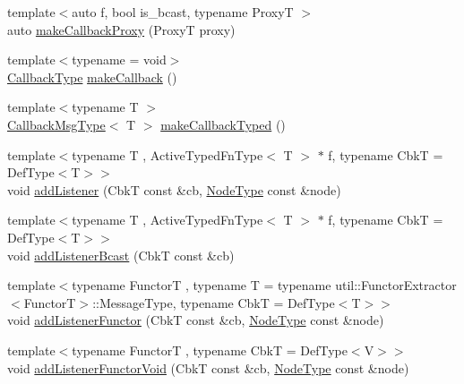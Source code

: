 \begin{DoxyCompactItemize}
\item 
{\footnotesize template$<$auto f, bool is\+\_\+bcast, typename ProxyT $>$ }\\auto \hyperlink{structvt_1_1pipe_1_1_pipe_manager_t_l_a342691748229aa8765834fe3dcec04b3}{make\+Callback\+Proxy} (ProxyT proxy)
\item 
{\footnotesize template$<$typename  = void$>$ }\\\hyperlink{structvt_1_1pipe_1_1_pipe_manager_t_l_a1cc1d0f1c80a36488f9b5d282e9755d2}{Callback\+Type} \hyperlink{structvt_1_1pipe_1_1_pipe_manager_t_l_aff965bd75d398d45ad11d33feeb7a7c5}{make\+Callback} ()
\item 
{\footnotesize template$<$typename T $>$ }\\\hyperlink{structvt_1_1pipe_1_1_pipe_manager_t_l_af6fc2c17f1729fa06450441b0ee81cb1}{Callback\+Msg\+Type}$<$ T $>$ \hyperlink{structvt_1_1pipe_1_1_pipe_manager_t_l_a9644742f82b43a851e8a20755302a2e0}{make\+Callback\+Typed} ()
\item 
{\footnotesize template$<$typename T , Active\+Typed\+Fn\+Type$<$ T $>$ $\ast$ f, typename CbkT  = Def\+Type$<$\+T$>$$>$ }\\void \hyperlink{structvt_1_1pipe_1_1_pipe_manager_t_l_a379d983dfbf654ed01281d96148175f3}{add\+Listener} (CbkT const \&cb, \hyperlink{namespacevt_a866da9d0efc19c0a1ce79e9e492f47e2}{Node\+Type} const \&node)
\item 
{\footnotesize template$<$typename T , Active\+Typed\+Fn\+Type$<$ T $>$ $\ast$ f, typename CbkT  = Def\+Type$<$\+T$>$$>$ }\\void \hyperlink{structvt_1_1pipe_1_1_pipe_manager_t_l_a137d7271f189aa000427a3cb39bd7f52}{add\+Listener\+Bcast} (CbkT const \&cb)
\item 
{\footnotesize template$<$typename FunctorT , typename T  = typename util\+::\+Functor\+Extractor$<$\+Functor\+T$>$\+::\+Message\+Type, typename CbkT  = Def\+Type$<$\+T$>$$>$ }\\void \hyperlink{structvt_1_1pipe_1_1_pipe_manager_t_l_abc9236c8ff7a657b1b04fd7604d616b9}{add\+Listener\+Functor} (CbkT const \&cb, \hyperlink{namespacevt_a866da9d0efc19c0a1ce79e9e492f47e2}{Node\+Type} const \&node)
\item 
{\footnotesize template$<$typename FunctorT , typename CbkT  = Def\+Type$<$\+V$>$$>$ }\\void \hyperlink{structvt_1_1pipe_1_1_pipe_manager_t_l_a12cd5abf9d9a082369419a5cc5b7b0f8}{add\+Listener\+Functor\+Void} (CbkT const \&cb, \hyperlink{namespacevt_a866da9d0efc19c0a1ce79e9e492f47e2}{Node\+Type} const \&node)

\end{DoxyCompactItemize}
